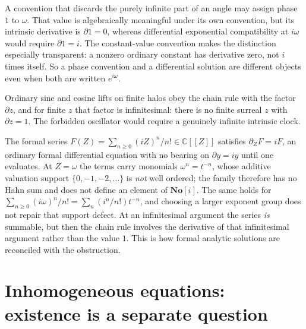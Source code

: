 \documentclass[11pt,letterpaper]{article}
\numberwithin{equation}{section}
\theoremstyle{definition}
\theoremstyle{remark}
\newcommand{\SC}{\mathbf{No}[i]}
\newcommand{\C}{\mathbb C}
\newcommand{\der}{\partial}
\newcommand{\derZ}{\der_{Z}}
\begin{document}
\begin{example}
\label{diff:ex:phaseconvention}
A convention that discards the purely infinite part of an angle may assign
phase $1$ to $\omega$. That value is algebraically meaningful under its own
convention, but its intrinsic derivative is $\der1=0$, whereas differential
exponential compatibility at $i\omega$ would require $\der1=i$. The
constant-value convention makes the distinction especially transparent: a
nonzero ordinary constant has derivative zero, not $i$ times itself. So a
phase convention and a differential solution are different objects even when
both are written $e^{i\omega}$.
\end{example}

\begin{remark}
\label{diff:rem:noclock}
Ordinary sine and cosine lifts on finite halos obey the chain rule with the
factor $\der z$, and for finite $z$ that factor is infinitesimal: there is no
finite surreal $z$ with $\der z=1$. The forbidden oscillator would require a
genuinely infinite intrinsic clock.
\end{remark}

\begin{remark}
\label{diff:rem:nonsummableexp}
The formal series $F(Z)=\sum_{n\geq0}(iZ)^{n}/n!\in\C[[Z]]$ satisfies
$\derZ F=iF$, an ordinary formal differential equation with no bearing on
$\der y=iy$ until one evaluates. At $Z=\omega$ the terms carry monomials
$\omega^{n}=t^{-n}$, whose additive valuation support
$\{0,-1,-2,\dots\}$ is \emph{not} well ordered; the family therefore has no
Hahn sum and does not define an element of $\SC$. The same holds for
$\sum_{n\geq0}(i\omega)^{n}/n!=\sum_{n}(i^{n}/n!)t^{-n}$, and choosing a
larger exponent group does not repair that support defect. At an
infinitesimal argument the series \emph{is} summable, but then the chain rule
involves the derivative of that infinitesimal argument rather than the value
$1$. This is how formal analytic solutions are reconciled with the
obstruction.
\end{remark}

\section{Inhomogeneous equations: existence is a separate question}
\label{diff:sec:inhom}
\end{document}
